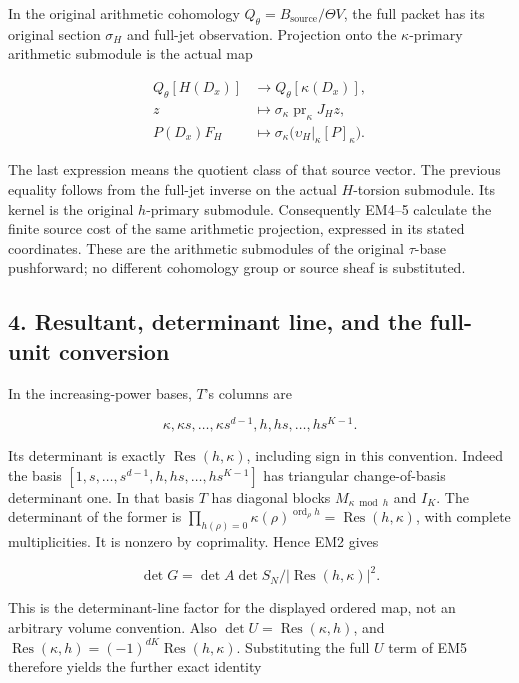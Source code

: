 In the original arithmetic cohomology \(Q_\theta=B_{\mathrm{source}}/\Theta V\), the
full packet has its original section \(\sigma_H\) and full-jet observation.
Projection onto the \(\kappa\)-primary arithmetic submodule is the actual map

\[
\begin{aligned}Q_\theta[H(D_x)]&\longrightarrow Q_\theta[\kappa(D_x)],\\z&\longmapsto\sigma_\kappa\operatorname{pr}_\kappa J_Hz,\\P(D_x)F_H&\longmapsto\sigma_\kappa\bigl(\upsilon_H|_\kappa[P]_\kappa\bigr).\end{aligned}\tag{EM6}
\]

The last expression means the quotient class of that source vector.
The previous equality follows from the full-jet inverse on the actual
\(H\)-torsion submodule. Its kernel is the original \(h\)-primary submodule.
Consequently EM4--5 calculate the finite source cost of the same
arithmetic projection, expressed in its stated coordinates. These are
the arithmetic submodules of the original \(\tau\)-base pushforward; no
different cohomology group or source sheaf is substituted.

\subsection{4. Resultant, determinant line, and the full-unit conversion}\label{EM-resultant-determinant-line-and-the-full-unit-conversion}

In the increasing-power bases, \(T\)'s columns are

\[
\kappa,\kappa s,\ldots,\kappa s^{d-1},h,hs,\ldots,hs^{K-1}.
\]

Its determinant is exactly \(\operatorname{Res}(h,\kappa)\), including sign in this convention.
Indeed the basis \([1,\allowbreak s,\allowbreak \ldots,\allowbreak s^{d-1},\allowbreak h,\allowbreak hs,\allowbreak \ldots,\allowbreak hs^{K-1}]\) has triangular
change-of-basis determinant one. In that basis \(T\) has diagonal blocks
\(M_{\kappa\bmod h}\) and \(I_K\). The determinant of the former is
\(\prod_{h(\rho)=0}\kappa(\rho)^{\operatorname{ord}_\rho h}=\operatorname{Res}(h,\kappa)\), with complete
multiplicities. It is nonzero by coprimality. Hence EM2 gives

\[
\det G=\det A\det S_N/|\operatorname{Res}(h,\kappa)|^2.\tag{EM7}
\]

This is the determinant-line factor for the displayed ordered map, not
an arbitrary volume convention. Also \(\det U=\operatorname{Res}(\kappa,h)\), and
\(\operatorname{Res}(\kappa,h)=(-1)^{dK}\operatorname{Res}(h,\kappa)\). Substituting the full \(U\) term of
EM5 therefore yields the further exact identity

